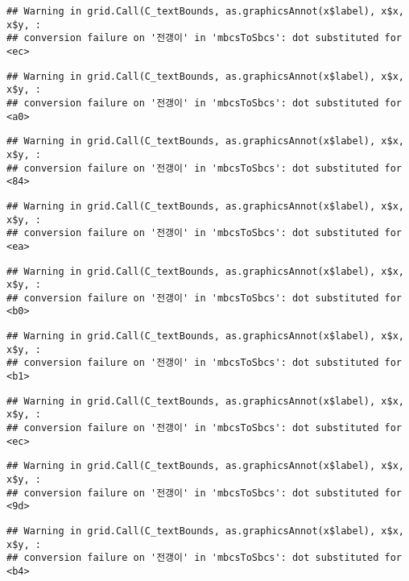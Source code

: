 \documentclass[
]{article}
\begin{document}
\begin{verbatim}
## Warning in grid.Call(C_textBounds, as.graphicsAnnot(x$label), x$x, x$y, :
## conversion failure on '전갱이' in 'mbcsToSbcs': dot substituted for <ec>
\end{verbatim}

\begin{verbatim}
## Warning in grid.Call(C_textBounds, as.graphicsAnnot(x$label), x$x, x$y, :
## conversion failure on '전갱이' in 'mbcsToSbcs': dot substituted for <a0>
\end{verbatim}

\begin{verbatim}
## Warning in grid.Call(C_textBounds, as.graphicsAnnot(x$label), x$x, x$y, :
## conversion failure on '전갱이' in 'mbcsToSbcs': dot substituted for <84>
\end{verbatim}

\begin{verbatim}
## Warning in grid.Call(C_textBounds, as.graphicsAnnot(x$label), x$x, x$y, :
## conversion failure on '전갱이' in 'mbcsToSbcs': dot substituted for <ea>
\end{verbatim}

\begin{verbatim}
## Warning in grid.Call(C_textBounds, as.graphicsAnnot(x$label), x$x, x$y, :
## conversion failure on '전갱이' in 'mbcsToSbcs': dot substituted for <b0>
\end{verbatim}

\begin{verbatim}
## Warning in grid.Call(C_textBounds, as.graphicsAnnot(x$label), x$x, x$y, :
## conversion failure on '전갱이' in 'mbcsToSbcs': dot substituted for <b1>
\end{verbatim}

\begin{verbatim}
## Warning in grid.Call(C_textBounds, as.graphicsAnnot(x$label), x$x, x$y, :
## conversion failure on '전갱이' in 'mbcsToSbcs': dot substituted for <ec>
\end{verbatim}

\begin{verbatim}
## Warning in grid.Call(C_textBounds, as.graphicsAnnot(x$label), x$x, x$y, :
## conversion failure on '전갱이' in 'mbcsToSbcs': dot substituted for <9d>
\end{verbatim}

\begin{verbatim}
## Warning in grid.Call(C_textBounds, as.graphicsAnnot(x$label), x$x, x$y, :
## conversion failure on '전갱이' in 'mbcsToSbcs': dot substituted for <b4>
\end{verbatim}
\end{document}
